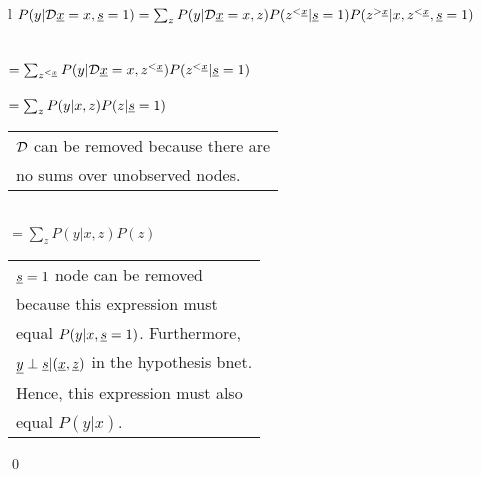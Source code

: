 \begin{claim}
\label{cl-decSBBackDoor}
\decSBBackDoor
\end{claim}
\proof
\begin{longtable}{l}
\color{red}
$P(y|\cald\rvx =x, \rvs=1)=
\sum_z
P(y|\cald\rvx=x, z)P(z^{<\rvx}|\rvs=1)
P(z^{>\rvx}|x,z^{<\rvx}, \rvs=1)$
\\
\\
\\
\color{red}
$= \sum_{z^{<\rvx}} P(y|\cald\rvx=x, z^{<\rvx})
P(z^{<\rvx}|\rvs=1)$
\\
\xymatrix{\\=}
\\
\color{red}
$= \sum_z P(y|x, z)
P(z|\rvs=1)$
\\
\xymatrix{\\=}
\begin{tabular}{l}
${\cal D}$ can be removed because there are\\
no sums over unobserved nodes.
\end{tabular}
\\
\color{red}
$= \sum_z P(y|x, z)
P(z)$
\\
\xymatrix{\\=}
\begin{tabular}{l}
$\rvs=1$ node can be removed\\ because
this expression must\\ equal
$P(y|x, \rvs=1)$. Furthermore,\\
$\rvy\perp\rvs|(\rvx,\rvz)$
in the hypothesis bnet.\\
Hence,  this expression must also
\\ equal $P(y|x)$.
\end{tabular}
\end{longtable}
\qed


%
